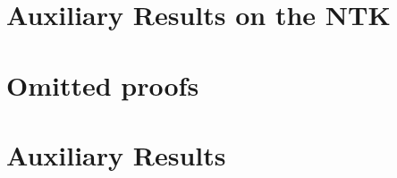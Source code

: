 \documentclass[twoside,11pt]{article}
\begin{document}
%  







  \section{Auxiliary Results on the NTK}
  


  \section{Omitted proofs}\label{sec:omitted-proofs}
  


  \section{Auxiliary Results}\label{sec:A_Aux}
  



  \vskip 0.2in
  
\end{document}
